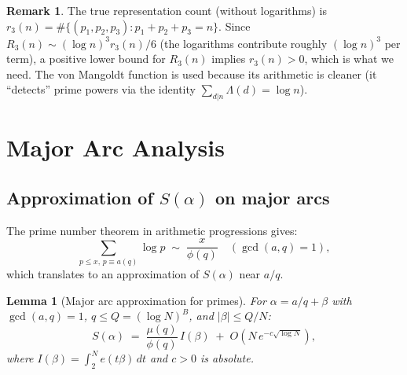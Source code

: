 \documentclass[12pt,a4paper]{amsart}
\newtheorem{lemma}[theorem]{Lemma}
\theoremstyle{definition}
\newtheorem{remark}[theorem]{Remark}
\newcommand{\eq}[1]{e\!\left(#1\right)}
\begin{document}
\begin{remark}
  The true representation count (without logarithms) is
  $r_3(n) = \#\{(p_1,p_2,p_3): p_1+p_2+p_3 = n\}$.  Since
  $R_3(n) \sim (\log n)^3 r_3(n) / 6$ (the logarithms contribute roughly
  $(\log n)^3$ per term), a positive lower bound for $R_3(n)$ implies
  $r_3(n) > 0$, which is what we need.  The von Mangoldt function is
  used because its arithmetic is cleaner (it ``detects'' prime powers
  via the identity $\sum_{d|n} \Lambda(d) = \log n$).
\end{remark}

\section{Major Arc Analysis}
\label{sec:major}

\subsection{Approximation of $S(\alpha)$ on major arcs}

The prime number theorem in arithmetic progressions gives:
\[
  \sum_{p \leq x,\, p \equiv a (q)} \log p \;\sim\; \frac{x}{\phi(q)}
  \quad (\gcd(a,q) = 1),
\]
which translates to an approximation of $S(\alpha)$ near $a/q$.

\begin{lemma}[Major arc approximation for primes]\label{lem:primeapprox}
  For $\alpha = a/q + \beta$ with $\gcd(a,q)=1$, $q \leq Q = (\log N)^B$,
  and $|\beta| \leq Q/N$:
  \[
    S(\alpha)
    \;=\; \frac{\mu(q)}{\phi(q)}\, I(\beta)
          \;+\; O\!\left(N\, e^{-c\sqrt{\log N}}\right),
  \]
  where $I(\beta) = \int_2^N \eq{t\beta}\, dt$ and $c > 0$ is absolute.
\end{lemma}
\end{document}
